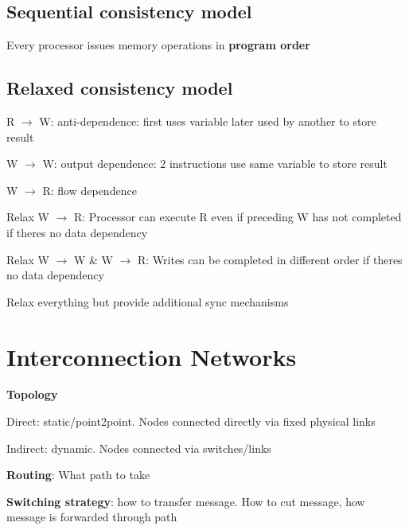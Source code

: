\documentclass[12pt]{article}
\begin{document}
\begin{spacing}{1.5}
\subsection{Sequential consistency model}

\begin{itemize*}
	\item Every processor issues memory operations in \textbf{program order}
\end{itemize*}

\subsection{Relaxed consistency model}

\begin{itemize*}
	\item R $\rightarrow$ W: anti-dependence: first uses variable later used by another to store result
	\item W $\rightarrow$ W: output dependence: 2 instructions use same variable to store result
	\item W $\rightarrow$ R: flow dependence
\end{itemize*}

\begin{itemize*}
	\item Relax W $\rightarrow$ R: Processor can execute R even if preceding W has not completed if theres no data dependency
	\item Relax W $\rightarrow$ W \& W $\rightarrow$ R: Writes can be completed in different order if theres no data dependency
	\item Relax everything but provide additional sync mechanisms
\end{itemize*}

\section{Interconnection Networks}

\textbf{Topology}

\begin{itemize*}
	\item Direct: static/point2point. Nodes connected directly via fixed physical links
	\item Indirect: dynamic. Nodes connected via switches/links
\end{itemize*}

\textbf{Routing}: What path to take

\textbf{Switching strategy}: how to transfer message. How to cut message, how message is forwarded through path


\end{spacing}
\end{document}
